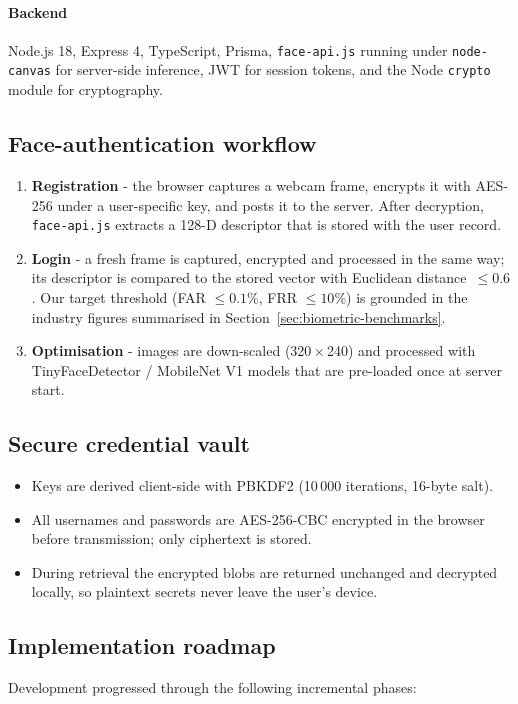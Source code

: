 \paragraph{Backend}
Node.js 18, Express 4, TypeScript, Prisma, \texttt{face-api.js} running under \texttt{node-canvas} for server-side inference, JWT for session tokens, and the Node \texttt{crypto} module for cryptography.

\subsection{Face-authentication workflow}
\begin{enumerate}
  \item \textbf{Registration} - the browser captures a webcam frame, encrypts it with AES-256 under a user-specific key, and posts it to the server. After decryption, \texttt{face-api.js} extracts a 128-D descriptor that is stored with the user record.
  \item \textbf{Login} - a fresh frame is captured, encrypted and processed in the same way; its descriptor is compared to the stored vector with Euclidean distance~$\le0.6$. Our target threshold (FAR $\leq 0.1\%$, FRR $\leq 10\%$) is grounded in the industry figures summarised in Section~\ref{sec:biometric-benchmarks}.
  \item \textbf{Optimisation} - images are down-scaled (320\,$\times$\,240) and processed with TinyFaceDetector / MobileNet V1 models that are pre-loaded once at server start.
\end{enumerate}

\subsection{Secure credential vault}
\begin{itemize}
  \item Keys are derived client-side with PBKDF2 (10\,000 iterations, 16-byte salt).  
  \item All usernames and passwords are AES-256-CBC encrypted in the browser before transmission; only ciphertext is stored.  
  \item During retrieval the encrypted blobs are returned unchanged and decrypted locally, so plaintext secrets never leave the user's device.  
\end{itemize}

\subsection{Implementation roadmap}
Development progressed through the following incremental phases:

